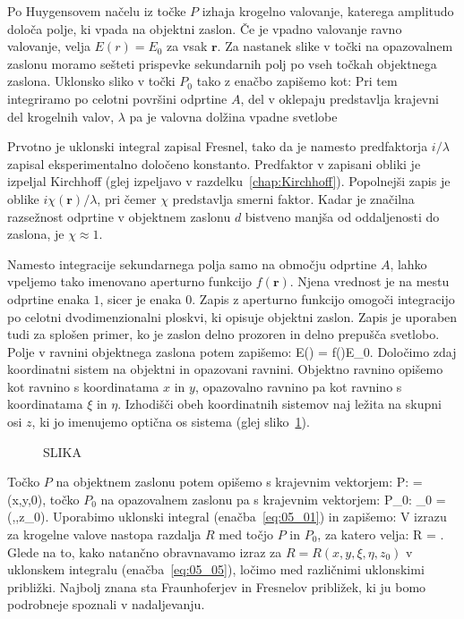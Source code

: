 Po Huygensovem načelu iz točke $P$ izhaja krogelno valovanje, katerega
amplitudo določa polje, ki vpada na objektni zaslon. Če je vpadno valovanje
ravno valovanje, velja $E(r) = E_0$ za vsak $\mathbf{r}$. Za nastanek slike
v točki na opazovalnem zaslonu moramo sešteti prispevke sekundarnih
polj po vseh točkah objektnega zaslona. Uklonsko sliko v točki $P_0$ 
tako z enačbo zapišemo kot:
Pri tem integriramo po celotni površini odprtine $A$, del v oklepaju predstavlja
krajevni del krogelnih valov, $\lambda$ pa je valovna dolžina vpadne svetlobe
\begin{remark}
Prvotno je uklonski integral zapisal Fresnel, tako da je namesto predfaktorja 
$i/\lambda$ zapisal eksperimentalno določeno konstanto. Predfaktor v zapisani
obliki je izpeljal Kirchhoff (glej izpeljavo v razdelku~\ref{chap:Kirchhoff}). 
Popolnejši zapis je oblike $i \chi(\mathbf{r})/\lambda$,
pri čemer $\chi$ predstavlja smerni faktor. Kadar je značilna razsežnost odprtine v 
objektnem zaslonu $d$ bistveno manjša od oddaljenosti do zaslona, 
je $\chi \approx 1$.
\end{remark}
Namesto integracije sekundarnega polja samo na območju odprtine $A$, lahko vpeljemo
tako imenovano aperturno funkcijo $f(\mathbf{r})$. Njena vrednost je na mestu odprtine enaka $1$,
sicer je enaka $0$. Zapis z aperturno funkcijo omogoči integracijo po celotni dvodimenzionalni
ploskvi, ki opisuje objektni zaslon. Zapis je uporaben tudi za splošen primer, ko je zaslon
delno prozoren in delno prepušča svetlobo. Polje v ravnini objektnega zaslona potem zapišemo:
\beq
E() = f()E_0.
\label{eq:05_02}
\eeq
Določimo zdaj koordinatni sistem na objektni in opazovani ravnini. Objektno ravnino
opišemo kot ravnino s koordinatama $x$ in $y$, opazovalno ravnino pa kot ravnino
s koordinatama $\xi$ in $\eta$. Izhodišči obeh koordinatnih sistemov naj ležita 
na skupni osi $z$, ki jo imenujemo optična os sistema (glej sliko~\ref{fig:05_koordinate}).
\begin{figure}[ht]
\centering
\def\svgwidth{120truemm} 
%
\caption{SLIKA}
\label{fig:05_koordinate}
\end{figure}

Točko $P$ na objektnem zaslonu potem opišemo s krajevnim vektorjem:
\beq
P:  = (x,y,0),
\label{eq:05_03}
\eeq
točko $P_0$ na opazovalnem zaslonu pa s krajevnim vektorjem:
\beq
P_0: _0 = (\xi,\eta,z_0).
\label{eq:05_04}
\eeq
Uporabimo uklonski integral (enačba~\ref{eq:05_01}) in zapišemo:
V izrazu za krogelne valove nastopa razdalja $R$ med točjo $P$ in $P_0$, za
katero velja:
\beq
R = .
\label{eq:05_06}
\eeq
Glede na to, kako natančno obravnavamo izraz za $R = R(x,y,\xi, \eta, z_0)$ v uklonskem
integralu (enačba~\ref{eq:05_05}), ločimo med različnimi uklonskimi približki. Najbolj 
znana sta Fraunhoferjev in Fresnelov približek, ki ju bomo podrobneje spoznali v nadaljevanju.

